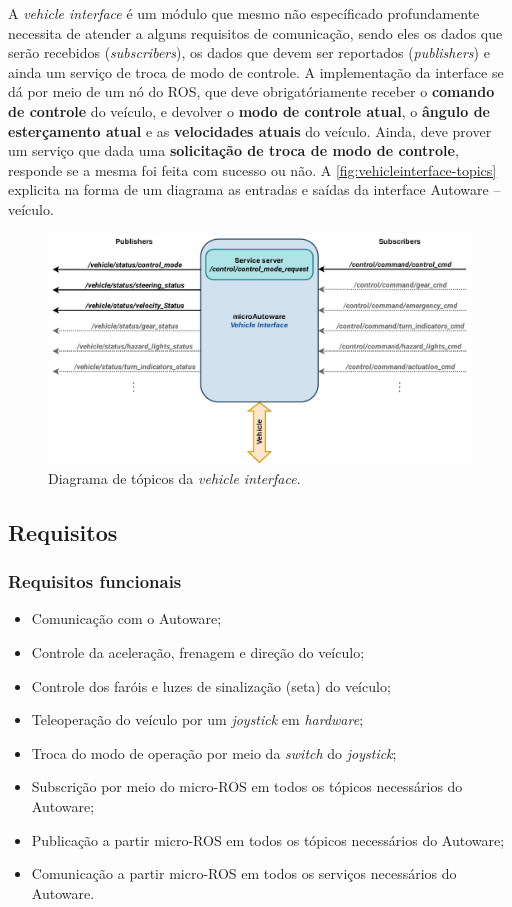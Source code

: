 A \textit{vehicle interface} é um módulo que mesmo não específicado profundamente necessita de atender a alguns requisitos de comunicação, sendo eles os dados que serão recebidos (\textit{subscribers}), os dados que devem ser reportados (\textit{publishers}) e ainda um serviço de troca de modo de controle. A implementação da interface se dá por meio de um nó do ROS, que deve obrigatóriamente receber o \textbf{comando de controle} do veículo, e devolver o \textbf{modo de controle atual}, o \textbf{ângulo de esterçamento atual} e as \textbf{velocidades atuais} do veículo. Ainda, deve prover um serviço que dada uma \textbf{solicitação de troca de modo de controle}, responde se a mesma foi feita com sucesso ou não. A \autoref{fig:vehicleinterface-topics} explicita na forma de um diagrama as entradas e saídas da interface Autoware -- veículo.

	\begin{figure}[H]
	\centering
	\includegraphics[width=0.75\linewidth]{img/vehicle_interface-topics}
	\caption{Diagrama de tópicos da \textit{vehicle interface}.}
	\label{fig:vehicleinterface-topics}
\end{figure}

\subsection{Requisitos}

\subsubsection*{Requisitos funcionais}
	
	\begin{itemize}
		\item Comunicação com o Autoware;
		\item Controle da aceleração, frenagem e direção do veículo;
		\item Controle dos faróis e luzes de sinalização (seta) do veículo;
		\item Teleoperação do veículo por um \textit{joystick} em  \textit{hardware};
		\item Troca do modo de operação por meio da \textit{switch} do \textit{joystick};
		\item Subscrição por meio do micro-ROS em todos os tópicos necessários do Autoware;
		\item Publicação a partir micro-ROS em todos os tópicos necessários do Autoware;
		\item Comunicação a partir micro-ROS em todos os serviços necessários do Autoware.
		
	\end{itemize}

